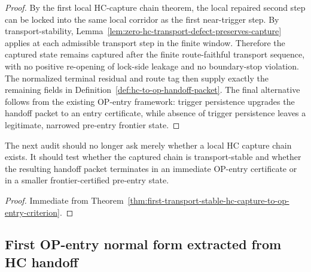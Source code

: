 \begin{proof}
By the first local HC-capture chain theorem, the local repaired second step can be locked into the same local corridor as the first near-trigger step.  By transport-stability, Lemma~\ref{lem:zero-hc-transport-defect-preserves-capture} applies at each admissible transport step in the finite window.  Therefore the captured state remains captured after the finite route-faithful transport sequence, with no positive re-opening of lock-side leakage and no boundary-stop violation.  The normalized terminal residual and route tag then supply exactly the remaining fields in Definition~\ref{def:hc-to-op-handoff-packet}.  The final alternative follows from the existing OP-entry framework: trigger persistence upgrades the handoff packet to an entry certificate, while absence of trigger persistence leaves a legitimate, narrowed pre-entry frontier state.
\end{proof}

\begin{corollary}
\label{cor:v3340-r01-working-rule}
The next audit should no longer ask merely whether a local HC capture chain exists.  It should test whether the captured chain is transport-stable and whether the resulting handoff packet terminates in an immediate OP-entry certificate or in a smaller frontier-certified pre-entry state.
\end{corollary}

\begin{proof}
Immediate from Theorem~\ref{thm:first-transport-stable-hc-capture-to-op-entry-criterion}.
\end{proof}



\subsection{First OP-entry normal form extracted from HC handoff}
\label{subsec:first-op-entry-normal-form-extracted-from-hc-handoff}

